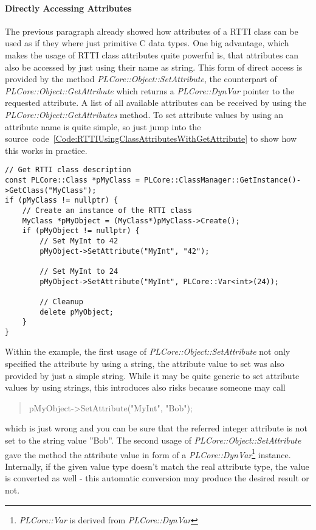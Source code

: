 \paragraph{Directly Accessing Attributes}
The previous paragraph already showed how attributes of a \ac{RTTI} class can be used as if they where just primitive C data types. One big advantage, which makes the usage of \ac{RTTI} class attributes quite powerful is, that attributes can also be accessed by just using their name as string. This form of direct access is provided by the method \emph{PLCore::Object::SetAttribute}, the counterpart of \emph{PLCore::Object::GetAttribute} which returns a \emph{PLCore::DynVar} pointer to the requested attribute. A list of all available attributes can be received by using the \emph{PLCore::Object::GetAttributes} method. To set attribute values by using an attribute name is quite simple, so just jump into the source~code~\ref{Code:RTTIUsingClassAttributesWithGetAttribute} to show how this works in practice.
\begin{lstlisting}[float=htb,label=Code:RTTIUsingClassAttributesWithGetAttribute,caption={Using \ac{RTTI} class attributes with the PLCore::Object::SetAttribute method}]
// Get RTTI class description
const PLCore::Class *pMyClass = PLCore::ClassManager::GetInstance()->GetClass("MyClass");
if (pMyClass != nullptr) {
	// Create an instance of the RTTI class
	MyClass *pMyObject = (MyClass*)pMyClass->Create();
	if (pMyObject != nullptr) {
		// Set MyInt to 42
		pMyObject->SetAttribute("MyInt", "42");

		// Set MyInt to 24
		pMyObject->SetAttribute("MyInt", PLCore::Var<int>(24));

		// Cleanup
		delete pMyObject;
	}
}
\end{lstlisting}
Within the example, the first usage of \emph{PLCore::Object::SetAttribute} not only specified the attribute by using a string, the attribute value to set was also provided by just a simple string. While it may be quite generic to set attribute values by using strings, this introduces also risks because someone may call \begin{quote}pMyObject->SetAttribute("MyInt", "Bob");\end{quote} which is just wrong and you can be sure that the referred integer attribute is not set to the string value ''Bob''. The second usage of \emph{PLCore::Object::SetAttribute} gave the method the attribute value in form of a \emph{PLCore::DynVar}\footnote{\emph{PLCore::Var} is derived from \emph{PLCore::DynVar}} instance. Internally, if the given value type doesn't match the real attribute type, the value is converted as well - this automatic conversion may produce the desired result or not.

